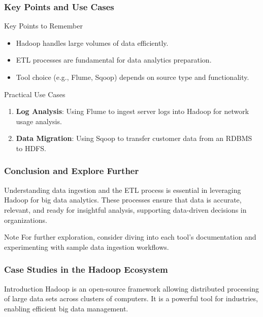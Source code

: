\documentclass[aspectratio=169]{beamer}
\begin{document}
\begin{frame}[fragile]
    \frametitle{Key Points and Use Cases}
    \begin{block}{Key Points to Remember}
        \begin{itemize}
            \item Hadoop handles large volumes of data efficiently.
            \item ETL processes are fundamental for data analytics preparation.
            \item Tool choice (e.g., Flume, Sqoop) depends on source type and functionality.
        \end{itemize}
    \end{block}

    \begin{block}{Practical Use Cases}
        \begin{enumerate}
            \item \textbf{Log Analysis}: Using Flume to ingest server logs into Hadoop for network usage analysis.
            \item \textbf{Data Migration}: Using Sqoop to transfer customer data from an RDBMS to HDFS.
        \end{enumerate}
    \end{block}
\end{frame}

\begin{frame}[fragile]
    \frametitle{Conclusion and Explore Further}
    Understanding data ingestion and the ETL process is essential in leveraging Hadoop for big data analytics. These processes ensure that data is accurate, relevant, and ready for insightful analysis, supporting data-driven decisions in organizations.

    \begin{block}{Note}
        For further exploration, consider diving into each tool's documentation and experimenting with sample data ingestion workflows.
    \end{block}
\end{frame}

\begin{frame}[fragile]
    \frametitle{Case Studies in the Hadoop Ecosystem}
    \begin{block}{Introduction}
        Hadoop is an open-source framework allowing distributed processing of large data sets across clusters of computers. It is a powerful tool for industries, enabling efficient big data management.
    \end{block}
\end{frame}
\end{document}
